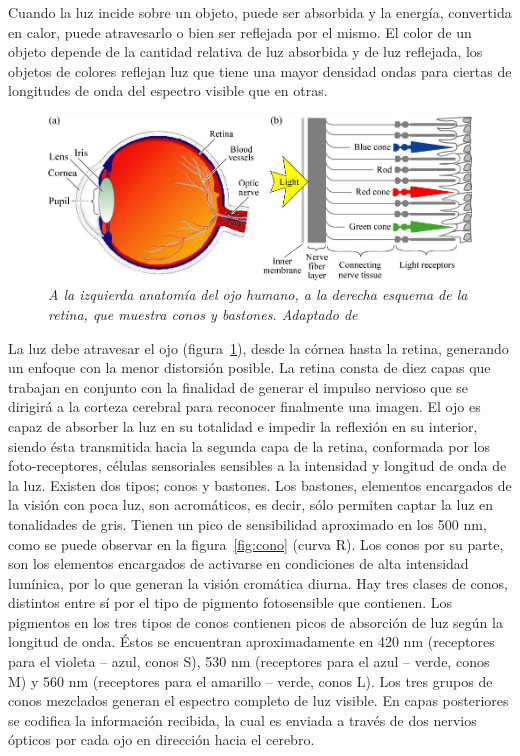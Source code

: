 Cuando la luz incide sobre un objeto, puede ser absorbida y la energía, convertida en calor, puede atravesarlo o bien ser reflejada por el mismo. El color de un objeto depende de la cantidad relativa de luz absorbida y de luz reflejada, los objetos de colores reflejan luz que tiene una mayor densidad ondas para ciertas de longitudes de onda del espectro visible que en otras. 

\begin{figure}[h]
  \centering
  \includegraphics[scale=.4]{images/ojo}
  \caption{\em A la izquierda anatomía del ojo humano, a la derecha esquema de la retina, que muestra conos y bastones. Adaptado de \cite{Britannica1994}}  
  \label{fig:ojo}
\end{figure}

La luz debe atravesar el ojo (figura~\ref{fig:ojo}), desde la córnea hasta la retina, generando un enfoque con la menor distorsión posible. La retina consta de diez capas que trabajan en conjunto con la finalidad de generar el impulso nervioso que se dirigirá a la corteza cerebral para reconocer finalmente una imagen. El ojo es capaz de absorber la luz en su totalidad e impedir la reflexión en su interior, siendo ésta transmitida hacia la segunda capa de la retina, conformada por los foto-receptores, células sensoriales sensibles a la intensidad y longitud de onda de la luz. Existen dos tipos; conos y bastones. Los bastones, elementos encargados de la visión con poca luz, son acromáticos, es decir, sólo permiten captar la luz en tonalidades de gris. Tienen un pico de sensibilidad aproximado en los 500 nm, como se puede observar en la figura~\ref{fig:cono} (curva R). Los conos por su parte, son los elementos encargados de activarse en condiciones de alta intensidad lumínica, por lo que generan la visión cromática diurna. Hay tres clases de conos, distintos entre sí por el tipo de pigmento fotosensible que contienen. Los pigmentos en los tres tipos de conos contienen picos de absorción de luz según la longitud de onda. Éstos se encuentran aproximadamente en 420 nm (receptores para el violeta – azul, conos S), 530 nm (receptores para el azul – verde, conos M) y 560 nm (receptores para el amarillo – verde, conos L). Los tres grupos de conos mezclados generan el espectro completo de luz visible. En capas posteriores se codifica la información recibida, la cual es enviada a través de dos nervios ópticos por cada ojo en dirección hacia el cerebro.

